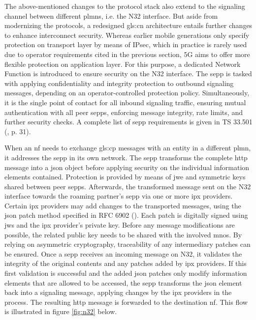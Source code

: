 The above-mentioned changes to the protocol stack also extend to the signaling channel between different \glspl{plmn}, i.e. the N32 interface.
But aside from modernizing the protocols, a redesigned \gls{gls:cn} architecture entails further changes to enhance interconnect security.
Whereas earlier mobile generations only specify protection on transport layer by means of IPsec, which in practice is rarely used due to operator requirements cited in the previous section, 5G aims to offer more flexible protection on application layer.
For this purpose, a dedicated Network Function is introduced to ensure security on the N32 interface.
The \gls{sepp} is tasked with applying confidentiality and integrity protection to outbound signaling messages, depending on an operator-controlled protection policy.
Simultaneously, it is the single point of contact for all inbound signaling traffic, ensuring mutual authentication with all peer \glspl{sepp}, enforcing message integrity, rate limits, and further security checks.
A complete list of \gls{sepp} requirements is given in TS 33.501 (\cite{3gpp.33.501}, p. 31).

When an \gls{nf} needs to exchange \gls{gls:cp} messages with an entity in a different \gls{plmn}, it addresses the \gls{sepp} in its own network.
The \gls{sepp} transforms the complete \gls{http} message into a \gls{json} object before applying security on the individual information elements contained.
Protection is provided by means of \gls{jwe} and symmetric keys shared between peer \glspl{sepp}.
Afterwards, the transformed message sent on the N32 interface towards the roaming partner's \gls{sepp} via one or more \gls{ipx} providers.
Certain \gls{ipx} providers may add changes to the transported messages, using the \gls{json} patch method specified in RFC 6902  (\cite{rfc6902}).
Each patch is digitally signed using \gls{jws} and the \gls{ipx} provider's private key.
Before any message modifications are possible, the related public key needs to be shared with the involved \glspl{mno}.
By relying on asymmetric cryptography, traceability of any intermediary patches can be ensured.
Once a \gls{sepp} receives an incoming message on N32, it validates the integrity of the original contents and any patches added by \gls{ipx} providers.
If this first validation is successful and the added \gls{json} patches only modify information elements that are allowed to be accessed, the \gls{sepp} transforms the \gls{json} element back into a signaling message, applying changes by the \gls{ipx} providers in the process.
The resulting \gls{http} message is forwarded to the destination \gls{nf}.
This flow is illustrated in figure \ref{fig:n32} below.

